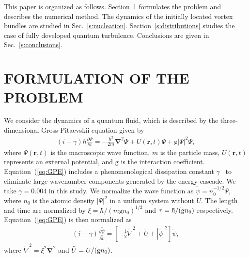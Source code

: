 \documentclass[aps,onecolumn,pra,longbibliography]{revtex4}
\begin{document}
	This paper is organized as follows.
	Section~\ref{s:formulation} formulates the problem and describes the numerical method.
	The dynamics of the initially located vortex bundles are studied in Sec.~\ref{s:nucleation}.
	Section~\ref{s:distributions} studies the case of fully developed quantum turbulence.
	Conclusions are given in Sec.~\ref{s:conclusions}.

	\section{FORMULATION OF THE PROBLEM}
	\label{s:formulation}
	We consider the dynamics of a quantum fluid,
	which is described by the three-dimensional
	Gross-Pitaevskii equation given by
	\begin{eqnarray}
		\label{eq:GPE}
		(i-\gamma) \hbar \frac{\partial \Psi}{\partial t}
		= - \frac{\hbar^2}{2m} \bm{\nabla}^2 \Psi
		+ U({\bm r}, t)\Psi
		+ \mathrm{g} | \Psi |^2 \Psi,
	\end{eqnarray}
	where $\Psi({\bm r},t)$ is the macroscopic wave function,
	$m$ is the particle mass,
	$U({\bm r},t)$ represents an external potential,
	and $\mathrm{g}$ is the interaction coefficient.
	Equation~(\ref{eq:GPE}) includes a phenomenological dissipation
	constant $\gamma$~\cite{M.Kobayashi1,M.Kobayashi2, M.Kobayashi3}
	to eliminate large-wavenumber components
	generated by the energy cascade. We take $\gamma = 0.004$ in this study.
	We normalize the wave function as $\tilde{\psi}=n_0^{-1/2}\Psi$,
	where $n_0$ is the atomic density $|\Psi|^2$
	in a uniform system without $U$.
	The length and time are normalized
	by $\xi = \hbar/(m \mathrm{g} n_0)^{1/2}$ and $\tau = \hbar/({\rm g}n_0)$
	respectively.
	Equation~(\ref{eq:GPE}) is then normalized as
	\begin{eqnarray}
		\label{eq:NGPE}
		(i-\gamma) \frac{\partial \tilde{\psi}}{\partial \tilde{t}}
		= \left[
			- \frac{1}{2} \tilde{\nabla}^2
			+ \tilde{U}
			+ |\tilde{\psi} |^2
		\right] \tilde{\psi},
	\end{eqnarray}
	where $\tilde{\nabla}^2 = \xi^2 \bm{\nabla}^2$ and $\tilde{U} = U/({\rm g}n_0)$.
\end{document}
